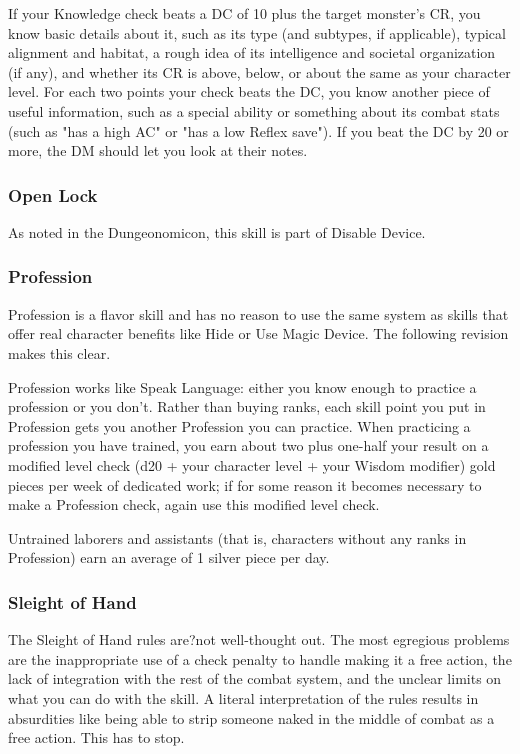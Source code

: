 If your Knowledge check beats a DC of 10 plus the target monster's CR, you know basic details about it, such as its type (and subtypes, if applicable), typical alignment and habitat, a rough idea of its intelligence and societal organization (if any), and whether its CR is above, below, or about the same as your character level. For each two points your check beats the DC, you know another piece of useful information, such as a special ability or something about its combat stats (such as "has a high AC" or "has a low Reflex save"). If you beat the DC by 20 or more, the DM should let you look at their notes.

\subsubsection{Open Lock}

As noted in the Dungeonomicon, this skill is part of Disable Device.

\subsubsection{Profession}

Profession is a flavor skill and has no reason to use the same system as skills that offer real character benefits like Hide or Use Magic Device. The following revision makes this clear.

Profession works like Speak Language: either you know enough to practice a profession or you don't. Rather than buying ranks, each skill point you put in Profession gets you another Profession you can practice. When practicing a profession you have trained, you earn about two plus one-half your result on a modified level check (d20 + your character level + your Wisdom modifier) gold pieces per week of dedicated work; if for some reason it becomes necessary to make a Profession check, again use this modified level check.

Untrained laborers and assistants (that is, characters without any ranks in Profession) earn an average of 1 silver piece per day.

\subsubsection{Sleight of Hand}

The Sleight of Hand rules are?not well-thought out. The most egregious problems are the inappropriate use of a check penalty to handle making it a free action, the lack of integration with the rest of the combat system, and the unclear limits on what you can do with the skill. A literal interpretation of the rules results in absurdities like being able to strip someone naked in the middle of combat as a free action. This has to stop.

